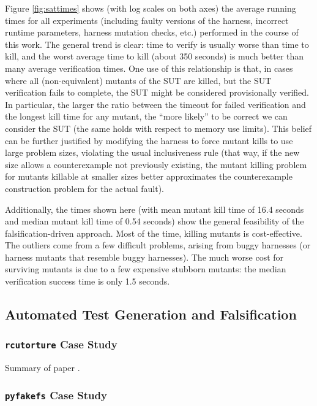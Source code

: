 \documentclass{svjour3}
\begin{document}
Figure \ref{fig:sattimes} shows (with log scales on both axes) the
average running times for all experiments (including faulty versions
of the harness, incorrect runtime parameters, harness mutation checks,
etc.) performed in the course of this work.  The general trend is
clear: time to verify is usually worse than time to kill, and the
worst average time to kill (about 350 seconds) is much better than
many average verification times.  One use of this relationship is
that, in cases where all (non-equivalent) mutants of the SUT are
killed, but the SUT verification fails to complete, the SUT might be
considered provisionally verified. In particular, the larger
the ratio between the timeout for failed verification and the longest
kill time for any mutant, the ``more likely'' to be correct we can
consider the SUT (the same holds with respect to memory use
limits). This belief can be further justified by modifying the harness
to force mutant kills to use large problem sizes, violating the usual
inclusiveness rule (that way, if the new size allows a counterexample
not previously existing, the mutant killing problem for mutants
killable at smaller sizes better approximates the counterexample
construction problem for the actual fault).

Additionally, the times shown here (with mean mutant kill time of 16.4
seconds and median mutant kill time of 0.54 seconds) show the general
feasibility of the falsification-driven approach.  Most of the time,
killing mutants is cost-effective.  The outliers come from a few
difficult problems, arising from buggy harnesses (or harness mutants
that resemble buggy harnesses).  The much worse cost for surviving
mutants is due to a few expensive stubborn mutants: the median
verification success time is only 1.5 seconds.

\subsection{Automated Test Generation and Falsification}

\subsubsection {{\tt rcutorture} Case Study}

Summary of paper \cite{mutKernel}.

\subsubsection {{\tt pyfakefs} Case Study}
\end{document}
